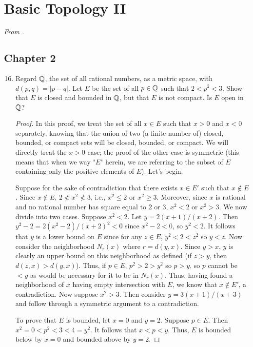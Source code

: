 \documentclass[../psets.tex]{subfiles}
\begin{document}
\section{Basic Topology II}
\emph{From \textcite{bib:Rudin}.}
\subsection*{Chapter 2}
\begin{enumerate}[label={\textbf{\arabic*.}}]
    \setcounter{enumi}{15}
    \item {}Regard $\mathbb{Q}$, the set of all rational numbers, as a metric space, with $d(p,q)=|p-q|$. Let $E$ be the set of all $p\in\mathbb{Q}$ such that $2<p^2<3$. Show that $E$ is closed and bounded in $\mathbb{Q}$, but that $E$ is not compact. Is $E$ open in $\mathbb{Q}$?
    \begin{proof}
        In this proof, we treat the set of all $x\in E$ such that $x>0$ and $x<0$ separately, knowing that the union of two (a finite number of) closed, bounded, or compact sets will be closed, bounded, or compact. We will directly treat the $x>0$ case; the proof of the other case is symmetric (this means that when we way "$E$" herein, we are referring to the subset of $E$ containing only the positive elements of $E$). Let's begin.\par\smallskip
        Suppose for the sake of contradiction that there exists $x\in E'$ such that $x\notin E$. Since $x\notin E$, $2\not<x^2\not<3$, i.e., $x^2\leq 2$ or $x^2\geq 3$. Moreover, since $x$ is rational and no rational number has square equal to 2 or 3, $x^2<2$ or $x^2>3$. We now divide into two cases. Suppose $x^2<2$. Let $y=2(x+1)/(x+2)$. Then $y^2-2=2(x^2-2)/(x+2)^2<0$ since $x^2-2<0$, so $y^2<2$. It follows that $y$ is a lower bound on $E$ since for any $z\in E$, $y^2<2<z^2$ so $y<z$. Now consider the neighborhood $N_r(x)$ where $r=d(y,x)$. Since $y>x$, $y$ is clearly an upper bound on this neighborhood as defined (if $z>y$, then $d(z,x)>d(y,x)$). Thus, if $p\in E$, $p^2>2>y^2$ so $p>y$, so $p$ cannot be $<y$ as would be necessary for it to be in $N_r(x)$. Thus, having found a neighborhood of $x$ having empty intersection with $E$, we know that $x\notin E'$, a contradiction. Now suppose $x^2>3$. Then consider $y=3(x+1)/(x+3)$ and follow through a symmetric argument to a contradiction.\par
        To prove that $E$ is bounded, let $x=0$ and $y=2$. Suppose $p\in E$. Then $x^2=0<p^2<3<4=y^2$. It follows that $x<p<y$. Thus, $E$ is bounded below by $x=0$ and bounded above by $y=2$.\par

\end{proof}
\end{enumerate}
\end{document}
